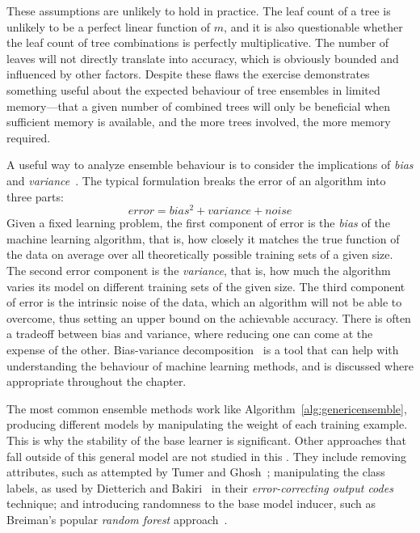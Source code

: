 These assumptions are unlikely to hold in practice. The leaf count of a tree is unlikely to be a perfect linear function of $m$, and it is also questionable whether the leaf count of tree combinations is perfectly multiplicative. The number of leaves will not directly translate into accuracy, which is obviously bounded and influenced by other factors. Despite these flaws the exercise demonstrates something useful about the expected behaviour of tree ensembles in limited memory---that a given number of combined trees will only be beneficial when sufficient memory is available, and the more trees involved, the more memory required. %

A useful way to analyze ensemble behaviour is to consider the implications of {\em bias} and {\em variance}~\cite{bvdilemma, bvdecomp}. The typical formulation breaks the error of an algorithm into three parts:
\begin{equation} \label{eq:bvdecomp}
error = bias^2 + variance + noise
\end{equation}
Given a fixed learning problem, the first component of error is the {\em bias} of the machine learning algorithm, that is, how closely it matches the true function of the data on average over all theoretically possible training sets of a given size. The second error component is the {\em variance}, that is, how much the algorithm varies its model on different training sets of the given size. The third component of error is the intrinsic noise of the data, which an algorithm will not be able to overcome, thus setting an upper bound on the achievable accuracy. There is often a tradeoff between bias and variance, where reducing one can come at the expense of the other. Bias-variance decomposition~\cite{bvdecomp} is a tool that can help with understanding the behaviour of machine learning methods, and is discussed where appropriate throughout the chapter. %

The most common ensemble methods work like Algorithm~\ref{alg:genericensemble}, producing different models by manipulating the weight of each training example. This is why the stability of the base learner is significant. Other approaches that fall outside of this general model are not studied in this  \thesisc. They include removing attributes, such as attempted by Tumer and Ghosh~\cite{tgensembles}; manipulating the class labels, as used by Dietterich and Bakiri~\cite{ecoc} in their {\em error-correcting output codes} technique; and introducing randomness to the base model inducer, such as Breiman's popular {\em random forest} approach~\cite{randomforests}.

